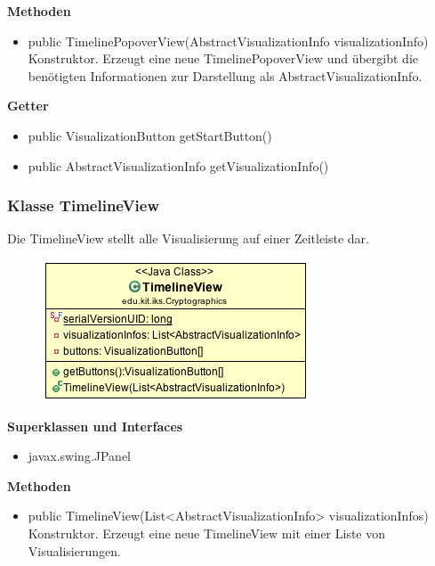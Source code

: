 \documentclass{article}
\begin{document}
      \textbf{Methoden}
      \begin{itemize}
        \item public TimelinePopoverView(AbstractVisualizationInfo visualizationInfo) \newline
        Konstruktor. Erzeugt eine neue TimelinePopoverView und übergibt die benötigten Informationen zur Darstellung als AbstractVisualizationInfo.
      \end{itemize}

      \textbf{Getter}
      \begin{itemize}
        \item public VisualizationButton getStartButton()
        \item public AbstractVisualizationInfo getVisualizationInfo()
      \end{itemize}

    \subsubsection{Klasse TimelineView}
      Die TimelineView stellt alle Visualisierung auf einer Zeitleiste dar.
      \begin{figure}[H]
        \centering
        \includegraphics{resources/edu-kit-iks-Cryptographics-TimelineView}
      \end{figure}

      \textbf{Superklassen und Interfaces}
      \begin{itemize}
        \item javax.swing.JPanel
      \end{itemize}
      
      \textbf{Methoden}
      \begin{itemize}
        \item public TimelineView(List<AbstractVisualizationInfo> visualizationInfos) \newline
        Konstruktor. Erzeugt eine neue TimelineView mit einer Liste von Visualisierungen.
      \end{itemize}
\end{document}
